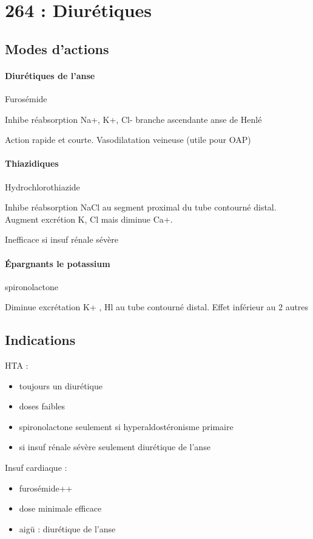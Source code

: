 \documentclass{article}
\begin{document}
\section{264 : Diurétiques}%
\label{sec:264_diuretiques}

\subsection{Modes d'actions}
\paragraph{Diurétiques de l'anse} Furosémide

Inhibe réabsorption Na+, K+, Cl- branche ascendante anse de Henlé

Action rapide et courte. Vasodilatation veineuse (utile pour OAP)

\paragraph{Thiazidiques} Hydrochlorothiazide

Inhibe réabsorption NaCl au segment proximal du tube contourné distal. Augment
excrétion K, Cl mais diminue Ca+.

Inefficace si insuf rénale sévère

\paragraph{Épargnants le potassium} spironolactone

Diminue excrétation K+ , Hl au tube contourné distal. Effet inférieur au 2
autres

\subsection{Indications}
HTA : 
\begin{itemize}
  \item toujours un diurétique
  \item doses faibles
  \item spironolactone seulement si hyperaldostéronisme primaire
  \item si insuf rénale sévère seulement diurétique de l'anse
\end{itemize}
Insuf cardiaque :
\begin{itemize}
  \item furosémide++
  \item dose minimale efficace
  \item aigü : diurétique de l'anse 
\end{itemize}
\end{document}
